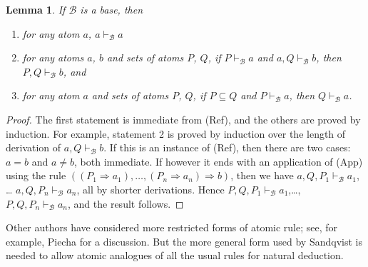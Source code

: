 \documentclass{sn-jnl}
\newcommand{\derives}[1]{\vdash_{\!#1}}
\newcommand{\base}[1]{\mathscr{#1}}
\renewcommand{\derives}[2]{\vdash_{\base{#1}}#2}
\newtheorem{lemma}[theorem]{Lemma}
\begin{document}
\begin{lemma}\label{lem:derives-is-consequence} If $\base{B}$ is a base, then
    \begin{enumerate}
        \item for any atom $a$, $a\derives{B}{a}$
        \item for any atoms $a$, $b$ and sets of atoms $P$, $Q$, 
        if $P\derives{B}{a}$ and $a,Q\derives{B}{b}$, then $P,Q\derives{B}{b}$, and 
        \item for any atom $a$ and sets of atoms $P$, $Q$, if $P\subseteq Q$ and 
        $P\derives{B}{a}$, then $Q\derives{B}{a}$. 
    \end{enumerate}
\end{lemma}
\begin{proof}
    The first statement is immediate from (Ref), and the others are proved by induction. For example, statement 2 is proved by induction over the length of derivation of $a,Q\derives{B}{b}$. If this is an instance of (Ref), then there are two cases: $a=b$ and $a\neq b$, both immediate. If however it ends with an application of (App) using the rule $((P_1 \Rightarrow a_1),\dots,(P_n \Rightarrow a_n) \Rightarrow b)$, then we have $a,Q,P_1\derives{B}{a_1}$, \dots 
    $a,Q,P_n\derives{B}{a_n}$, all by shorter derivations. Hence $P,Q,P_1\derives{B}{a_1}$,\dots, $P,Q,P_n\derives{B}{a_n}$, and the result follows. 
\end{proof}

Other authors have considered more restricted forms of atomic rule; see, for example, Piecha \cite{Piecha2016completeness} for a discussion. But the more general form used by Sandqvist is needed to allow atomic analogues of all the usual rules for natural deduction. 

\smallskip 
\end{document}
